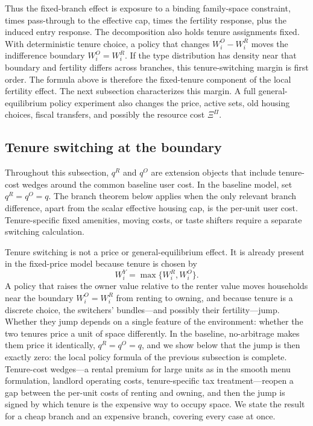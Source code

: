 \documentclass[11pt]{article}
\newcommand{\1}{\mathbf 1}
\begin{document}
Thus the fixed-branch effect is exposure to a binding family-space constraint, times pass-through to the effective cap, times the fertility response, plus the induced entry response. The decomposition also holds tenure assignments fixed. With deterministic tenure choice, a policy that changes $W_i^O-W_i^R$ moves the indifference boundary $W_i^O=W_i^R$. If the type distribution has density near that boundary and fertility differs across branches, this tenure-switching margin is first order. The formula above is therefore the fixed-tenure component of the local fertility effect. The next subsection characterizes this margin. A full general-equilibrium policy experiment also changes the price, active sets, old housing choices, fiscal transfers, and possibly the resource cost $\Xi^\Pi$.

\subsection{Tenure switching at the boundary}

Throughout this subsection, $q^R$ and $q^O$ are extension objects that include tenure-cost wedges around the common baseline user cost. In the baseline model, set $q^R=q^O=q$. The branch theorem below applies when the only relevant branch difference, apart from the scalar effective housing cap, is the per-unit user cost. Tenure-specific fixed amenities, moving costs, or taste shifters require a separate switching calculation.

Tenure switching is not a price or general-equilibrium effect. It is already present in the fixed-price model because tenure is chosen by
\[
W_i^Y=\max\{W_i^R,W_i^O\}.
\]
A policy that raises the owner value relative to the renter value moves households near the boundary $W_i^O=W_i^R$ from renting to owning, and because tenure is a discrete choice, the switchers' bundles---and possibly their fertility---jump. Whether they jump depends on a single feature of the environment: whether the two tenures price a unit of space differently. In the baseline, no-arbitrage makes them price it identically, $q^R=q^O=q$, and we show below that the jump is then exactly zero: the local policy formula of the previous subsection is complete. Tenure-cost wedges---a rental premium for large units as in the smooth menu formulation, landlord operating costs, tenure-specific tax treatment---reopen a gap between the per-unit costs of renting and owning, and then the jump is signed by which tenure is the expensive way to occupy space. We state the result for a cheap branch and an expensive branch, covering every case at once.
\end{document}
